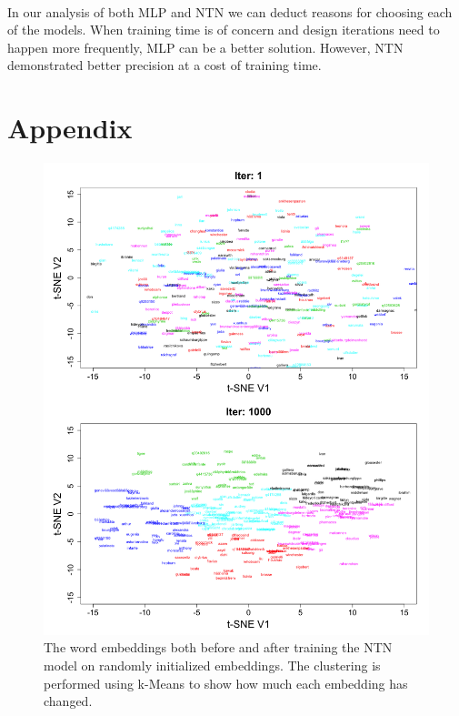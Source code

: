 \documentclass[11.5pt]{article}
\newcounter{graphics}
\begin{document}
\paragraph{} In our analysis of both MLP and NTN we can deduct reasons for choosing each of the models. When training time is of concern and design iterations need to happen more frequently, MLP can be a better solution. However, NTN demonstrated better precision at a cost of training time.

\pagebreak

{}


\section*{Appendix}
\begin{figure}[h!]
\centerline{\includegraphics[width=1\textwidth]{report_ntn/FirstLast-tSNE.png}}
  \caption{\small  The word embeddings both before and after training the NTN model on randomly initialized embeddings. The clustering is performed using k-Means to show how much each embedding has changed. }
\label{tSNE}
\end{figure}
\end{document}
